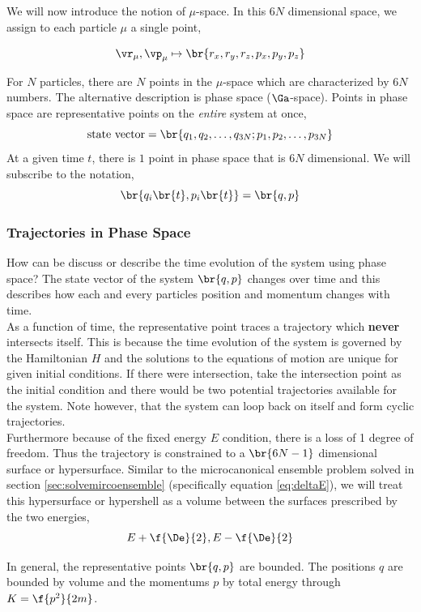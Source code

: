 \documentclass{article}
\begin{document}

We will now introduce the notion of $\mu$-space. In this $6N$ dimensional space, we assign to each particle $\mu$ a single point,

\[ \vr_\mu , \vp_\mu \mapsto \br{r_x, r_y, r_z, p_x, p_y, p_z} \]

For $N$ particles, there are $N$ points in the $\mu$-space which are characterized by $6N$ numbers. The alternative description is phase space ($\Ga$-space). Points in phase space are representative points on the \textit{entire} system at once,
\[ \text{state vector} = \br{q_1, q_2, \ldots , q_{3N} ; p_1, p_2, \ldots , p_{3N}} \]
At a given time $t$, there is $1$ point in phase space that is $6N$ dimensional. We will subscribe to the notation,
\[ \br{q_i\br{t}, p_i\br{t}} = \br{q,p} \]

\subsubsection{Trajectories in Phase Space}
How can be discuss or describe the time evolution of the system using phase space? The state vector of the system $\br{q,p}$ changes over time and this describes how each and every particles position and momentum changes with time.\\

As a function of time, the representative point traces a trajectory which \textbf{never} intersects itself. This is because the time evolution of the system is governed by the Hamiltonian $H$ and the solutions to the equations of motion are unique for given initial conditions. If there were intersection, take the intersection point as the initial condition and there would be two potential trajectories available for the system. Note however, that the system can loop back on itself and form cyclic trajectories. \\

Furthermore because of the fixed energy $E$ condition, there is a loss of 1 degree of freedom. Thus the trajectory is constrained to a $\br{6N-1}$ dimensional surface or hypersurface. Similar to the microcanonical ensemble problem solved in section \ref{sec:solvemircoensemble} (specifically equation \eqref{eq:deltaE}), we will treat this hypersurface or hypershell as a volume between the surfaces prescribed by the two energies,
\[ E + \f{\De}{2}, E - \f{\De}{2} \]

In general, the representative points $\br{q,p}$ are bounded. The positions $q$ are bounded by volume and the momentums $p$ by total energy through $K = \f{p^2}{2m}$.\\
\end{document}
